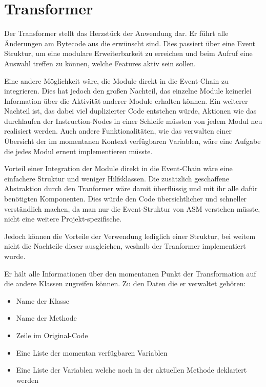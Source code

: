 \section{Transformer} 
\label{sec:trans}

Der Transformer stellt das Herzstück der Anwendung dar. Er führt alle Änderungen am Bytecode aus die erwünscht sind. Dies passiert über eine Event Struktur, um eine modulare Erweiterbarkeit zu erreichen und beim Aufruf eine Auswahl treffen zu können, welche Features aktiv sein sollen.

Eine andere Möglichkeit wäre, die Module direkt in die Event-Chain zu integrieren. Dies hat jedoch den großen Nachteil, das einzelne Module keinerlei Information über die Aktivität anderer Module erhalten können. Ein weiterer Nachteil ist, das dabei viel duplizierter Code entstehen würde, Aktionen wie das durchlaufen der Instruction-Nodes in einer Schleife müssten von jedem Modul neu realisiert werden. Auch andere Funktionalitäten, wie das verwalten einer Übersicht der im momentanen Kontext verfügbaren Variablen, wäre eine Aufgabe die jedes Modul erneut implementieren müsste.

Vorteil einer Integration der Module direkt in die Event-Chain wäre eine einfachere Struktur und weniger Hilfsklassen. Die zusätzlich geschaffene Abstraktion durch den Tranformer wäre damit überflüssig und mit ihr alle dafür benötigten Komponenten. Dies würde den Code übersichtlicher und schneller verständlich machen, da man nur die Event-Struktur von ASM verstehen müsste, nicht eine weitere Projekt-spezifische.

Jedoch können die Vorteile der Verwendung lediglich einer Struktur, bei weitem nicht die Nachteile dieser ausgleichen, weshalb der Tranformer implementiert wurde.

Er hält alle Informationen über den momentanen Punkt der Transformation auf die andere Klassen zugreifen können. Zu den Daten die er verwaltet gehören:

\begin{itemize}
	\item Name der Klasse
	\item Name der Methode
	\item Zeile im Original-Code
	\item Eine Liste der momentan verfügbaren Variablen
	\item Eine Liste der Variablen welche noch in der aktuellen Methode deklariert werden
\end{itemize}

